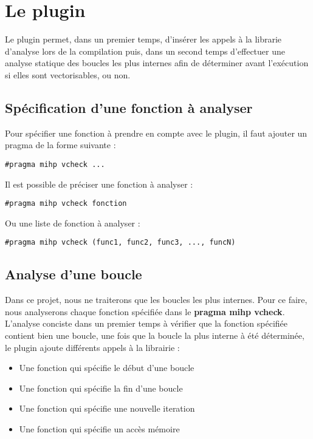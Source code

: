 \documentclass[12pt,french]{article}
\begin{document}
\section{\color{blue}Le plugin}

Le plugin permet, dans un premier temps, d'insérer les appels à la librarie d'analyse lors de la compilation puis, dans un second temps d'effectuer une analyse statique des boucles les plus internes afin de déterminer avant l'exécution si elles sont vectorisables, ou non.

	\subsection{\color{blue}Spécification d'une fonction à analyser}

Pour spécifier une fonction à prendre en compte avec le plugin, il faut ajouter un pragma de la forme suivante :

\begin{center}
\color{green}
\begin{lstlisting}
#pragma mihp vcheck ...
\end{lstlisting}
\end{center}

Il est possible de préciser une fonction à analyser :

\begin{center}
\color{green}
\begin{lstlisting}
#pragma mihp vcheck fonction
\end{lstlisting}
\end{center}

Ou une liste de fonction à analyser :

\begin{center}
\color{green}
\begin{lstlisting}
#pragma mihp vcheck (func1, func2, func3, ..., funcN)
\end{lstlisting}
\end{center}

	\subsection{\color{blue}Analyse d'une boucle}

Dans ce projet, nous ne traiterons que les boucles les plus internes. Pour ce faire, nous analyserons chaque fonction spécifiée dans le \textbf{pragma mihp vcheck}. L'analyse conciste dans un premier temps à vérifier que la fonction spécifiée contient bien une boucle, une fois que la boucle la plus interne à été déterminée, le plugin ajoute différents appels à la librairie :
\vspace{0.5cm}
\begin{itemize}
\item Une fonction qui spécifie le début d'une boucle
\item Une fonction qui spécifie la fin d'une boucle
\item Une fonction qui spécifie une nouvelle iteration
\item Une fonction qui spécifie un accès mémoire
\end{itemize}
\vspace{0.5cm}
\end{document}
